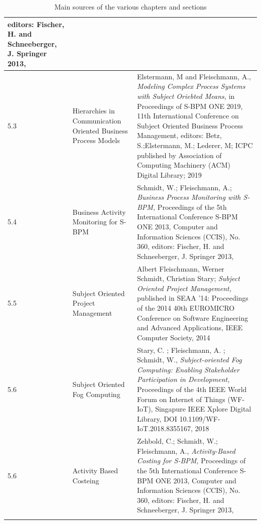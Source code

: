 \begin{longtable}[t]{ p{1 cm} p{4 cm} p{7 cm} }
		editors: Fischer, H. and Schneeberger, J.\newline
		Springer 2013,
		\\
		\midrule
		5.3 & Hierarchies in Communication Oriented Business Process Models & Elstermann, M and Fleischmann, A.,\newline
		\textit{Modeling Complex Process Systems with Subject Oriebted Means,}\newline
		in Proceedings of S-BPM ONE 2019, 11th International Conference on Subject Oriented Business Process Management,\newline
		editors: Betz, S.;Elstermann, M.; Lederer, M; \newline
		ICPC published by Association of Computing Machinery (ACM) Digital Library; 2019
		\\
		\midrule
		5.4 & Business Activity Monitoring for S-BPM & Schmidt, W.; Fleischmann, A.;\newline
		\textit{Business Process Monitoring with S-BPM,}\newline
		Proceedings of the 5th International Conference S-BPM ONE 2013, Computer and Information Sciences (CCIS), No. 360,\newline
		editors: Fischer, H. and Schneeberger, J.\newline
		Springer 2013,
		\\
		\midrule
		5.5 & Subject Oriented Project Management & Albert Fleischmann, Werner Schmidt, Christian Stary;\newline
		\textit{Subject Oriented Project Management,}\newline
		published in SEAA '14: Proceedings of the 2014 40th EUROMICRO Conference on Software Engineering and Advanced Applications,\newline
		IEEE Computer Society, 2014
		\\
		\midrule
		5.6 & Subject Oriented Fog Computing & Stary, C. ; Fleischmann, A. ; Schmidt, W., \newline
		\textit{Subject-oriented Fog Computing: Enabling Stakeholder Participation in Development,} \newline
		Proceedings of the 4th IEEE World Forum on Internet of Things (WF-IoT), Singapure \newline
		IEEE Xplore Digital Library, DOI 10.1109/WF-IoT.2018.8355167, 2018
		\\
		\midrule
		5.6 & Activity Based Costeing &  Zehbold, C.; Schmidt, W.; Fleischmann, A.,\newline
		\textit{Activity-Based Costing for S-BPM,}\newline
		Proceedings of the 5th International Conference S-BPM ONE 2013, Computer and Information Sciences (CCIS), No. 360,\newline
		editors: Fischer, H. and Schneeberger, J.\newline
		Springer 2013,
		\\
\bottomrule
\caption{Main sources of the various chapters and sections}
\label{tbl:sources}
\end{longtable}